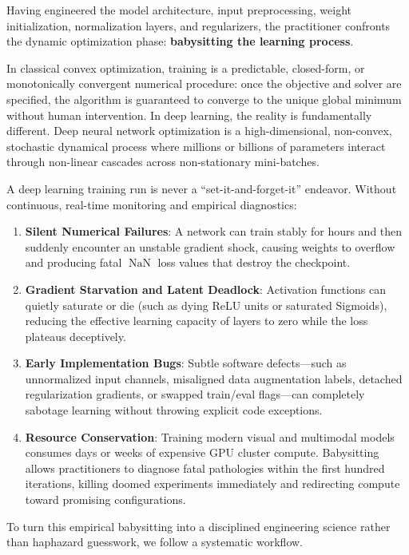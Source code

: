 Having engineered the model architecture, input preprocessing, weight initialization, normalization layers, and regularizers, the practitioner confronts the dynamic optimization phase: \textbf{babysitting the learning process}.

In classical convex optimization, training is a predictable, closed-form, or monotonically convergent numerical procedure: once the objective and solver are specified, the algorithm is guaranteed to converge to the unique global minimum without human intervention. In deep learning, the reality is fundamentally different. Deep neural network optimization is a high-dimensional, non-convex, stochastic dynamical process where millions or billions of parameters interact through non-linear cascades across non-stationary mini-batches.

A deep learning training run is never a ``set-it-and-forget-it'' endeavor. Without continuous, real-time monitoring and empirical diagnostics:
\begin{enumerate}[leftmargin=*]
  \item \textbf{Silent Numerical Failures}: A network can train stably for hours and then suddenly encounter an unstable gradient shock, causing weights to overflow and producing fatal $\operatorname{NaN}$ loss values that destroy the checkpoint.
  \item \textbf{Gradient Starvation and Latent Deadlock}: Activation functions can quietly saturate or die (such as dying ReLU units or saturated Sigmoids), reducing the effective learning capacity of layers to zero while the loss plateaus deceptively.
  \item \textbf{Early Implementation Bugs}: Subtle software defects---such as unnormalized input channels, misaligned data augmentation labels, detached regularization gradients, or swapped train/eval flags---can completely sabotage learning without throwing explicit code exceptions.
  \item \textbf{Resource Conservation}: Training modern visual and multimodal models consumes days or weeks of expensive GPU cluster compute. Babysitting allows practitioners to diagnose fatal pathologies within the first hundred iterations, killing doomed experiments immediately and redirecting compute toward promising configurations.
\end{enumerate}

To turn this empirical babysitting into a disciplined engineering science rather than haphazard guesswork, we follow a systematic workflow.

